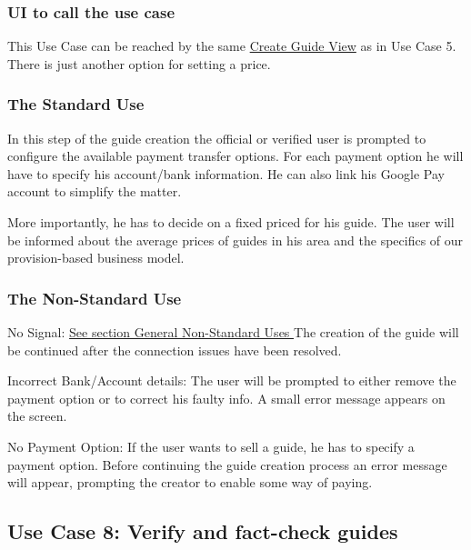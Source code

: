 \documentclass[12pt]{article}
\theoremstyle{definition}
\newenvironment{text}{
   \setlength{\parindent}{0pt}
   \color{black}
}{}
\begin{document}
    \subsubsection{UI to call the use case}
    \begin{text}
    This Use Case can be reached by the same \hyperref[fig:create_guide]{Create Guide View} as in Use Case 5. There is just another option for setting a price.
    \end{text}
    
    \subsubsection{The Standard Use}
    \begin{text}
    In this step of the guide creation the official or verified user is prompted to configure the available payment transfer options. For each payment option he will have to specify his account/bank information. He can also link his Google Pay account to simplify the matter. 
    
    More importantly, he has to decide on a fixed priced for his guide. 
    The user will be informed about the average prices of guides in his area and the specifics of our provision-based business model.
    \end{text}
    
    \subsubsection{The Non-Standard Use}
    \begin{text}
    
    No Signal: \hyperref[sec:gnsu]{See section General Non-Standard Uses } 
    The creation of the guide will be continued after the connection issues have been resolved.
    
    Incorrect Bank/Account details: The user will be prompted to either remove the payment option or to correct his faulty info. A small error message appears on the screen.
    
    No Payment Option: If the user wants to sell a guide, he has to specify a payment option. Before continuing the guide creation process an error message will appear, prompting the creator to enable some way of paying. 
    
    \end{text}

\subsection{Use Case 8: Verify and fact-check guides}
\label{sec:verifyguides}
\end{document}
